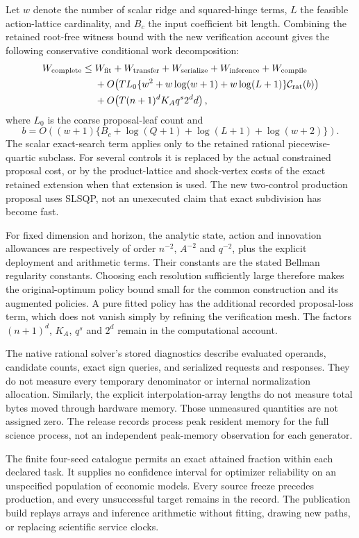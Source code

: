 Let $w$ denote the number of scalar ridge and squared-hinge terms, $L$ the feasible action-lattice cardinality, and $B_c$ the input coefficient bit length. Combining the retained root-free witness bound with the new verification account gives the following conservative conditional work decomposition:
\begin{align*}
 W_{\rm complete}\le {}&W_{\rm fit}+W_{\rm transfer}+W_{\rm serialize}
                       +W_{\rm inference}+W_{\rm compile}\\
 &+O\!\left(TL_0\{w^2+w\log(w+1)+w\log(L+1)\}
                      \mathcal C_{\rm rat}(b)\right)\\
 &+O\!\left(T(n+1)^dK_Aq^s2^d d\right),
\end{align*}
where $L_0$ is the coarse proposal-leaf count and
\[
 b=O\!\left((w+1)\{B_c+\log(Q+1)+\log(L+1)+\log(w+2)\}\right).
\]
The scalar exact-search term applies only to the retained rational piecewise-quartic subclass. For several controls it is replaced by the actual constrained proposal cost, or by the product-lattice and shock-vertex costs of the exact retained extension when that extension is used. The new two-control production proposal uses SLSQP, not an unexecuted claim that exact subdivision has become fast.

For fixed dimension and horizon, the analytic state, action and innovation allowances are respectively of order $n^{-2}$, $A^{-2}$ and $q^{-2}$, plus the explicit deployment and arithmetic terms. Their constants are the stated Bellman regularity constants. Choosing each resolution sufficiently large therefore makes the original-optimum policy bound small for the common construction and its augmented policies. A pure fitted policy has the additional recorded proposal-loss term, which does not vanish simply by refining the verification mesh. The factors $(n+1)^d$, $K_A$, $q^s$ and $2^d$ remain in the computational account.

The native rational solver's stored diagnostics describe evaluated operands, candidate counts, exact sign queries, and serialized requests and responses. They do not measure every temporary denominator or internal normalization allocation. Similarly, the explicit interpolation-array lengths do not measure total bytes moved through hardware memory. Those unmeasured quantities are not assigned zero. The release records process peak resident memory for the full science process, not an independent peak-memory observation for each generator.

The finite four-seed catalogue permits an exact attained fraction within each declared task. It supplies no confidence interval for optimizer reliability on an unspecified population of economic models. Every source freeze precedes production, and every unsuccessful target remains in the record. The publication build replays arrays and inference arithmetic without fitting, drawing new paths, or replacing scientific service clocks.
